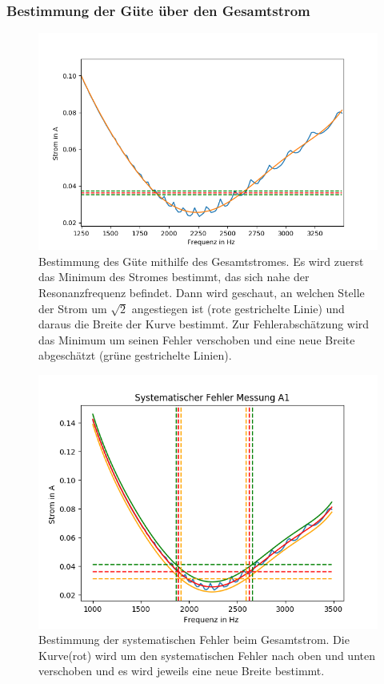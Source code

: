\documentclass[12pt,a4paper]{article}
\begin{document}
\subsubsection{Bestimmung der Güte über den Gesamtstrom}
\begin{figure}
\centering
\includegraphics[scale=0.8]{Bilder/Parallel_Iges.png}
\caption{Bestimmung des Güte mithilfe des Gesamtstromes. Es wird zuerst das Minimum des Stromes bestimmt, das sich nahe der Resonanzfrequenz befindet. Dann wird geschaut, an welchen Stelle der Strom um $\sqrt{2}$ angestiegen ist (rote gestrichelte Linie) und daraus die Breite der Kurve bestimmt. Zur Fehlerabschätzung wird das Minimum um seinen Fehler verschoben und eine neue Breite abgeschätzt (grüne gestrichelte Linien). }
\label{fig:parallel_Iges}
\end{figure}

\begin{figure}
\centering
\includegraphics[scale=1]{Bilder/Parallel_sys.png}
\caption{Bestimmung der systematischen Fehler beim Gesamtstrom. Die Kurve(rot) wird um den systematischen Fehler nach oben und unten verschoben und es wird jeweils eine neue Breite bestimmt.}
\label{fig:parallel_sys}
\end{figure}
\end{document}
